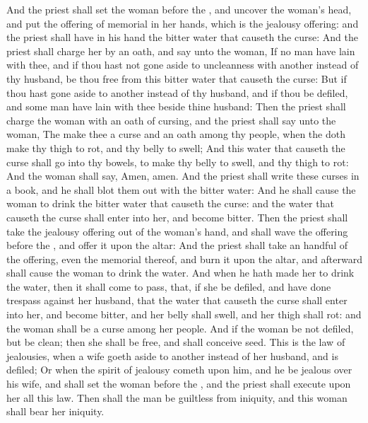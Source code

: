 \begin{biblechapter}
\verse And the priest shall set the woman before the \LORD, and uncover the woman's head, and put the offering of memorial in her hands, which is the jealousy offering: and the priest shall have in his hand the bitter water that causeth the curse:
\verse And the priest shall charge her by an oath, and say unto the woman, If no man have lain with thee, and if thou hast not gone aside to uncleanness with another instead of thy husband, be thou free from this bitter water that causeth the curse:
\verse But if thou hast gone aside to another instead of thy husband, and if thou be defiled, and some man have lain with thee beside thine husband:
\verse Then the priest shall charge the woman with an oath of cursing, and the priest shall say unto the woman, The \LORD make thee a curse and an oath among thy people, when the \LORD doth make thy thigh to rot, and thy belly to swell;
\verse And this water that causeth the curse shall go into thy bowels, to make thy belly to swell, and thy thigh to rot: And the woman shall say, Amen, amen.
\verse And the priest shall write these curses in a book, and he shall blot them out with the bitter water:
\verse And he shall cause the woman to drink the bitter water that causeth the curse: and the water that causeth the curse shall enter into her, and become bitter.
\verse Then the priest shall take the jealousy offering out of the woman's hand, and shall wave the offering before the \LORD, and offer it upon the altar:
\verse And the priest shall take an handful of the offering, even the memorial thereof, and burn it upon the altar, and afterward shall cause the woman to drink the water.
\verse And when he hath made her to drink the water, then it shall come to pass, that, if she be defiled, and have done trespass against her husband, that the water that causeth the curse shall enter into her, and become bitter, and her belly shall swell, and her thigh shall rot: and the woman shall be a curse among her people.
\verse And if the woman be not defiled, but be clean; then she shall be free, and shall conceive seed.
\verse This is the law of jealousies, when a wife goeth aside to another instead of her husband, and is defiled;
\verse Or when the spirit of jealousy cometh upon him, and he be jealous over his wife, and shall set the woman before the \LORD, and the priest shall execute upon her all this law.
\verse Then shall the man be guiltless from iniquity, and this woman shall bear her iniquity.
\end{biblechapter}

